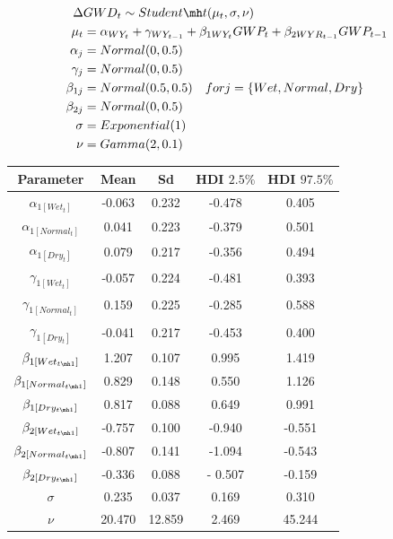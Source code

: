 \documentclass[11pt,a4paper]{article}
\begin{document}
\begin{align}
\Delta & GWD_{t} \sim Student \mh t(\mu_{t},\sigma,\nu) & \notag\\
\mu_t & = \alpha_{WY_{t}} +  \gamma_{WY_{t-1}} + \beta_{1  WY_{t}}GWP_{t} + \beta_{2  WYR_{t-1}} GWP_{t-1} \notag\\
\alpha_j & = Normal(0 ,0.5)\notag\\
\gamma_j & = Normal(0,0.5)\\
\beta_{1j} & = Normal(0.5,0.5) \hspace{1em}  for j = \{Wet,Normal,Dry\} \notag\\
\beta_{2j} & = Normal(0,0.5) \notag\\
\sigma & = Exponential(1) \notag\\
\nu & = Gamma(2,0.1)\notag
\end{align}

\begin{center}
\begin{tabular}{ |c|c|c|c|c| }
 \hline
 Parameter & Mean & Sd & HDI $2.5\%$ & HDI $97.5\%$ \\ 
 \hline
$\alpha_{1[Wet_{t}]}$ & 	-0.063 &	0.232 &	-0.478 &	0.405 		 \\
$\alpha_{1[Normal_{t}]}$ & 0.041 &	0.223 &	-0.379 &	0.501 	 \\
$\alpha_{1[Dry_{t}]}$ & 	 0.079 &	0.217 &	-0.356 &	0.494	 \\
$\gamma_{1[Wet_{t}]}$ & 	-0.057 	& 0.224 &	-0.481 &	0.393 	 \\
$\gamma_{1[Normal_{t}]}$ & 0.159 &	0.225 &	-0.285 &	0.588 \\
$\gamma_{1[Dry_{t}]}$ & -0.041 &	0.217 &	-0.453 &	0.400 	 \\
$\beta_{1[Wet_{t \mh 1}]}$ & 1.207 &	0.107 &	0.995 &	1.419 	 \\
$\beta_{1[Normal_{t \mh 1}]}$ 	& 0.829 &	0.148 &	0.550 &	1.126	\\
$\beta_{1[Dry_{t \mh 1}]}$ & 0.817 &	0.088 &	0.649 &	0.991 \\
$\beta_{2[Wet_{t \mh 1}]}$ & -0.757 	& 0.100 & -0.940 & 	-0.551 	 \\
$\beta_{2[Normal_{t \mh 1}]}$ & -0.807 &	0.141 &	-1.094 & -0.543 	\\
$\beta_{2[Dry_{t \mh 1}]}$ & -0.336 	& 0.088 & 	- 0.507 &  -0.159 \\
$\sigma$ & 0.235 & 	0.037 & 0.169 & 	0.310 \\
$\nu$ 	& 20.470 & 	12.859 & 2.469 &  	45.244 \\
\hline
\end{tabular}
\end{center}
\end{document}
